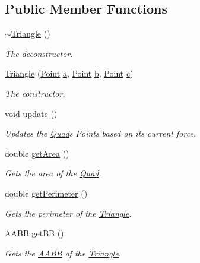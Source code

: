 \subsection*{Public Member Functions}
\begin{DoxyCompactItemize}
\item 
\mbox{\hyperlink{class_triangle_a5199760a17454f4dc94c855a57e3a152}{$\sim$\+Triangle}} ()
\begin{DoxyCompactList}\small\item\em The deconstructor. \end{DoxyCompactList}\item 
\mbox{\hyperlink{class_triangle_a01caaa9f22c8dc0208f612f8f1738cd3}{Triangle}} (\mbox{\hyperlink{class_point}{Point}} \mbox{\hyperlink{class_triangle_a08d2940a819cebd3321beeebbaef389e}{a}}, \mbox{\hyperlink{class_point}{Point}} \mbox{\hyperlink{class_triangle_af4167c2fce79260b261531d0b0fd3798}{b}}, \mbox{\hyperlink{class_point}{Point}} \mbox{\hyperlink{class_triangle_a972f16cb46805d72e9421b3c42ebc980}{c}})
\begin{DoxyCompactList}\small\item\em The constructor. \end{DoxyCompactList}\item 
void \mbox{\hyperlink{class_triangle_a7fbd07ca45c992b433e193f442993e54}{update}} ()
\begin{DoxyCompactList}\small\item\em Updates the \mbox{\hyperlink{class_quad}{Quad}}\textquotesingle{}s Points based on its current force. \end{DoxyCompactList}\item 
double \mbox{\hyperlink{class_triangle_a19b449e6969b9288e189ced41c3aca40}{get\+Area}} ()
\begin{DoxyCompactList}\small\item\em Gets the area of the \mbox{\hyperlink{class_quad}{Quad}}. \end{DoxyCompactList}\item 
double \mbox{\hyperlink{class_triangle_a692f12975e5a86c757f9d73c0228070e}{get\+Perimeter}} ()
\begin{DoxyCompactList}\small\item\em Gets the perimeter of the \mbox{\hyperlink{class_triangle}{Triangle}}. \end{DoxyCompactList}\item 
\mbox{\hyperlink{class_a_a_b_b}{A\+A\+BB}} \mbox{\hyperlink{class_triangle_a6f8c4358b9aa4de071618729547f4fd5}{get\+BB}} ()
\begin{DoxyCompactList}\small\item\em Gets the \mbox{\hyperlink{class_a_a_b_b}{A\+A\+BB}} of the \mbox{\hyperlink{class_triangle}{Triangle}}. \end{DoxyCompactList}\item 

\end{DoxyCompactItemize}
